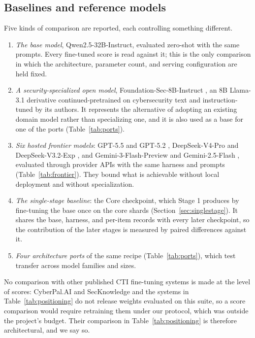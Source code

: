 \documentclass[a4paper,fleqn]{cas-dc}
\begin{document}
\subsection{Baselines and reference models}\label{sec:baselines}
Five kinds of comparison are reported, each controlling something different.
\begin{enumerate}
\item \emph{The base model}, Qwen2.5-32B-Instruct, evaluated zero-shot with the same prompts. Every fine-tuned score is read against it; this is the only comparison in which the architecture, parameter count, and serving configuration are held fixed.
\item \emph{A security-specialized open model}, Foundation-Sec-8B-Instruct \citep{kassianik2025foundationsec}, an 8B Llama-3.1 derivative continued-pretrained on cybersecurity text and instruction-tuned by its authors. It represents the alternative of adopting an existing domain model rather than specializing one, and it is also used as a base for one of the ports (Table~\ref{tab:ports}).
\item \emph{Six hosted frontier models}: GPT-5.5 and GPT-5.2 \citep{openai2026gpt55,openai2025gpt52}, DeepSeek-V4-Pro and DeepSeek-V3.2-Exp \citep{deepseek2026v4,deepseek2025v32exp}, and Gemini-3-Flash-Preview and Gemini-2.5-Flash \citep{google2025gemini3flash,comanici2025gemini25}, evaluated through provider APIs with the same harness and prompts (Table~\ref{tab:frontier}). They bound what is achievable without local deployment and without specialization.
\item \emph{The single-stage baseline}: the Core checkpoint, which Stage 1 produces by fine-tuning the base once on the core shards (Section~\ref{sec:singlestage}). It shares the base, harness, and per-item records with every later checkpoint, so the contribution of the later stages is measured by paired differences against it.
\item \emph{Four architecture ports} of the same recipe (Table~\ref{tab:ports}), which test transfer across model families and sizes.
\end{enumerate}
No comparison with other published CTI fine-tuning systems is made at the level of scores: CyberPal.AI and SecKnowledge \citep{levi2025cyberpal} and the systems in Table~\ref{tab:positioning} do not release weights evaluated on this suite, so a score comparison would require retraining them under our protocol, which was outside the project's budget. Their comparison in Table~\ref{tab:positioning} is therefore architectural, and we say so.
\end{document}
